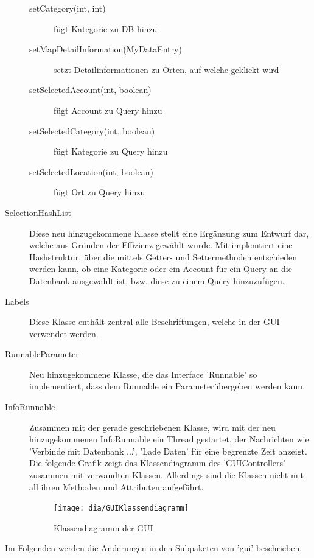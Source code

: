 \begin{description}
\begin{description}
			\item[setCategory(int, int)] fügt Kategorie zu DB hinzu
			\item[setMapDetailInformation(MyDataEntry)] setzt Detailinformationen zu Orten, auf welche geklickt wird
			\item[setSelectedAccount(int, boolean)] fügt Account zu Query hinzu
			\item[setSelectedCategory(int, boolean)] fügt Kategorie zu Query hinzu
			\item[setSelectedLocation(int, boolean)] fügt Ort zu Query hinzu
		\end{description}
		\item [SelectionHashList]
		\quad
		Diese neu hinzugekommene Klasse stellt  eine Ergänzung zum Entwurf dar, welche aus Gründen der Effizienz gewählt wurde. Mit implemtiert eine Hashstruktur, über die mittels Getter- und Settermethoden entschieden werden kann, ob eine Kategorie oder ein Account für ein Query an die Datenbank ausgewählt ist, bzw. diese zu einem Query hinzuzufügen.
		\item [Labels] 
		\quad
		Diese Klasse enthält zentral alle Beschriftungen, welche in der GUI verwendet werden.
		\item [RunnableParameter] 
		\quad 
		Neu hinzugekommene Klasse, die das Interface 'Runnable' so implementiert, dass dem Runnable ein Parameterübergeben werden kann.
		\item[InfoRunnable] 
		\quad
		Zusammen mit der gerade geschriebenen Klasse, wird mit der neu hinzugekommenen InfoRunnable ein Thread gestartet, der Nachrichten wie 'Verbinde mit Datenbank ...', 'Lade Daten' für eine begrenzte Zeit anzeigt.	
		Die folgende Grafik zeigt das Klassendiagramm des 'GUIControllers' zusammen mit verwandten Klassen. Allerdings sind die Klassen nicht mit all ihren Methoden und Attributen aufgeführt.
		\begin{figure}[h!]
			\centering
			\texttt{[image: dia/GUIKlassendiagramm]}
			\caption{Klassendiagramm der GUI}
			\label{fig:GUI}
		\end{figure}
	\end{description}
		Im Folgenden werden die Änderungen in den Subpaketen von 'gui' beschrieben.
